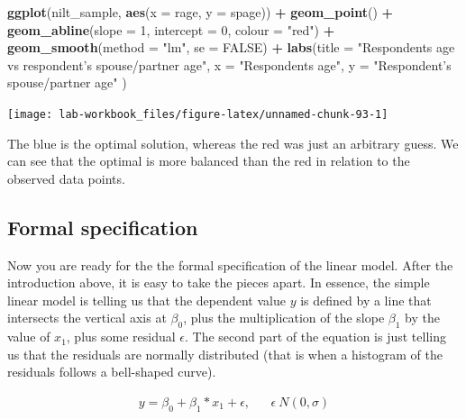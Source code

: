 \documentclass[
]{book}
\newenvironment{Shaded}{\begin{snugshade}}{\end{snugshade}}
\newcommand{\AttributeTok}[1]{\textcolor[rgb]{0.13,0.29,0.53}{#1}}
\newcommand{\ConstantTok}[1]{\textcolor[rgb]{0.56,0.35,0.01}{#1}}
\newcommand{\DecValTok}[1]{\textcolor[rgb]{0.00,0.00,0.81}{#1}}
\newcommand{\FunctionTok}[1]{\textcolor[rgb]{0.13,0.29,0.53}{\textbf{#1}}}
\newcommand{\NormalTok}[1]{#1}
\newcommand{\SpecialCharTok}[1]{\textcolor[rgb]{0.81,0.36,0.00}{\textbf{#1}}}
\newcommand{\StringTok}[1]{\textcolor[rgb]{0.31,0.60,0.02}{#1}}
\begin{document}
\begin{Shaded}
\begin{Highlighting}[]
\FunctionTok{ggplot}\NormalTok{(nilt\_sample, }\FunctionTok{aes}\NormalTok{(}\AttributeTok{x =}\NormalTok{ rage, }\AttributeTok{y =}\NormalTok{ spage)) }\SpecialCharTok{+} 
  \FunctionTok{geom\_point}\NormalTok{() }\SpecialCharTok{+}
  \FunctionTok{geom\_abline}\NormalTok{(}\AttributeTok{slope =} \DecValTok{1}\NormalTok{, }\AttributeTok{intercept =} \DecValTok{0}\NormalTok{, }\AttributeTok{colour =} \StringTok{"red"}\NormalTok{) }\SpecialCharTok{+}
  \FunctionTok{geom\_smooth}\NormalTok{(}\AttributeTok{method =} \StringTok{"lm"}\NormalTok{, }\AttributeTok{se =} \ConstantTok{FALSE}\NormalTok{) }\SpecialCharTok{+}
   \FunctionTok{labs}\NormalTok{(}\AttributeTok{title =} \StringTok{"Respondent\textquotesingle{}s age vs respondent’s spouse/partner age"}\NormalTok{, }
       \AttributeTok{x =} \StringTok{"Respondent\textquotesingle{}s age"}\NormalTok{, }\AttributeTok{y =} \StringTok{"Respondent’s spouse/partner age"}\NormalTok{ )}
\end{Highlighting}
\end{Shaded}

\begin{flushleft}\texttt{[image: lab-workbook\_files/figure-latex/unnamed-chunk-93-1]} \end{flushleft}

The blue is the optimal solution, whereas the red was just an arbitrary guess. We can see that the optimal is more balanced than the red in relation to the observed data points.

\hypertarget{formal-specification}{%
\subsection{Formal specification}\label{formal-specification}}

Now you are ready for the the formal specification of the linear model. After the introduction above, it is easy to take the pieces apart. In essence, the simple linear model is telling us that the dependent value \(y\) is defined by a line that intersects the vertical axis at \(\beta_0\), plus the multiplication of the slope \(\beta_1\) by the value of \(x_1\), plus some residual \(\epsilon\). The second part of the equation is just telling us that the residuals are normally distributed (that is when a histogram of the residuals follows a bell-shaped curve).

\[
\begin{align}
y = \beta_0 + \beta_1 * x_1 + \epsilon, && \epsilon ~ N(0, \sigma)  
\end{align}
\]
\end{document}
